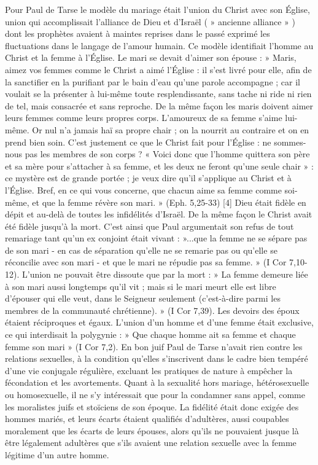  Pour Paul de Tarse le modèle du mariage était l'union du Christ avec son Église, union qui accomplissait l'alliance de Dieu et d'Israël ( » ancienne alliance » ) dont les prophètes avaient à maintes reprises dans le passé exprimé les fluctuations dans le langage de l'amour humain. Ce modèle identifiait l'homme au Christ et la femme à l'Église. Le mari se devait d'aimer son épouse : » Maris, aimez vos femmes comme le Christ a aimé l'Église : il s'est livré pour elle, afin de la sanctifier en la purifiant par le bain d'eau qu'une parole accompagne ; car il voulait se la présenter à lui-même toute resplendissante, sans tache ni ride ni rien de tel, mais consacrée et sans reproche. De la même façon les maris doivent aimer leurs femmes comme leurs propres corps. L'amoureux de sa femme s'aime lui-même. Or nul n'a jamais haï sa propre chair ; on la nourrit au contraire et on en prend bien soin. C'est justement ce que le Christ fait pour l'Église : ne sommes-nous pas les membres de son corps ? « Voici donc que l'homme quittera son père et sa mère pour s'attacher à sa femme, et les deux ne feront qu'une seule chair » : ce mystère est de grande portée ; je veux dire qu'il s'applique au Christ et à l'Église. Bref, en ce qui vous concerne, que chacun aime sa femme comme soi-même, et que la femme révère son mari. » (Eph. 5,25-33) [4] 
 Dieu était fidèle en dépit et au-delà de toutes les infidélités d'Israël. De la même façon le Christ avait été fidèle jusqu'à la mort. C'est ainsi que Paul argumentait son refus de tout remariage tant qu'un ex conjoint était vivant : »...que la femme ne se sépare pas de son mari - en cas de séparation qu'elle ne se remarie pas ou qu'elle se réconcilie avec son mari - et que le mari ne répudie pas sa femme. » (I Cor 7,10-12). L'union ne pouvait être dissoute que par la mort : » La femme demeure liée à son mari aussi longtemps qu'il vit ; mais si le mari meurt elle est libre d'épouser qui elle veut, dans le Seigneur seulement (c'est-à-dire parmi les membres de la communauté chrétienne). » (I Cor 7,39). 
 Les devoirs des époux étaient réciproques et égaux. L'union d'un homme et d'une femme était exclusive, ce qui interdisait la polygynie : » Que chaque homme ait sa femme et chaque femme son mari » (I Cor 7,2). En bon juif Paul de Tarse n'avait rien contre les relations sexuelles, à la condition qu'elles s'inscrivent dans le cadre bien tempéré d'une vie conjugale régulière, excluant les pratiques de nature à empêcher la fécondation et les avortements. Quant à la sexualité hors mariage, hétérosexuelle ou homosexuelle, il ne s'y intéressait que pour la condamner sans appel, comme les moralistes juifs et stoïciens de son époque. La fidélité était donc exigée des hommes mariés, et leurs écarts étaient qualifiés d'adultères, aussi coupables moralement que les écarts de leurs épouses, alors qu'ils ne pouvaient jusque là être légalement adultères que s'ils avaient une relation sexuelle avec la femme légitime d'un autre homme. 
